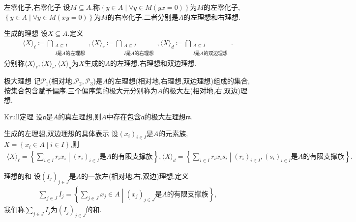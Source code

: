 \begin{example}{左零化子,右零化子}{}
	设$M\subseteq A$.称$\left\{y\in A\middle|\forall y\in M\left(yx=0\right)\right\}$为$M$的左零化子,$\left\{y\in A\middle|\forall y\in M\left(xy=0\right)\right\}$为$M$的右零化子.二者分别是$A$的左理想和右理想.
\end{example}

\begin{example}{生成的理想}{}
	设$X\subseteq A$.定义
	\begin{align*}
		\langle X\rangle_{\ell}\coloneq\bigcap\limits_{\substack{A\subseteq I\\I\text{是}A\text{的左理想}}},\langle X\rangle_{r}\coloneq\bigcap\limits_{\substack{A\subseteq I\\I\text{是}A\text{的右理想}}},\langle X\rangle_{d}\coloneq\bigcap\limits_{\substack{A\subseteq I\\I\text{是}A\text{的双边理想}}}.
	\end{align*}
	分别称$\langle X\rangle_{\ell},\langle X\rangle_{r},\langle X\rangle_{d}$为$X$生成的$A$的左理想,右理想和双边理想.
\end{example}

\begin{definition}{极大理想}{}
	记$\mathcal{P}_{1}$(相对地,$\mathcal{P}_{2},\mathcal{P}_{3}$)是$A$的左理想(相对地,右理想,双边理想)组成的集合,按集合包含赋予偏序.三个偏序集的极大元分别称为$A$的极大左(相对地,右,双边)理想.
\end{definition}

\begin{theorem}{Krull定理}{}
	设$\mathfrak{a}$是$A$的真左理想,则$A$中存在包含$\mathfrak{a}$的极大左理想$\mathfrak{m}$.
\end{theorem}

\begin{proposition}{生成的左理想,双边理想的具体表示}{}
	设$\left(x_{i}\right)_{i\in I}$是$A$的元素族,$X=\left\{x_{i}\in A\middle|i\in I\right\}$,则
	\begin{align*}
		\langle X\rangle_{\ell}=\left\{\sum\limits_{i\in I}r_{i}x_{i}\middle|\left(r_{i}\right)_{i\in I}\text{是}A\text{的有限支撑族}\right\},\langle X\rangle_{d}=\left\{\sum\limits_{i\in I}r_{i}x_{i}s_{i}\middle|\left(r_{i}\right)_{i\in I},\left(s_{i}\right)_{i\in I}\text{是}A\text{的有限支撑族}\right\}.
	\end{align*}
\end{proposition}

\begin{definition}{理想的和}{}
	设$\left(I_{j}\right)_{j\in J}$是$A$的一族左(相对地,右,双边)理想.定义
	\begin{align*}
		\sum\limits_{j\in J}I_{j}=\left\{\sum\limits_{j\in J}x_{j}\in A\middle|\left(x_{j}\right)_{j\in J}\text{是}A\text{的有限支撑族}\right\},
	\end{align*}
	我们称$\sum\limits_{j\in J}I_{j}$为$\left(I_{j}\right)_{j\in J}$的和.
\end{definition}

